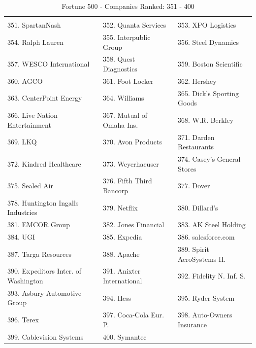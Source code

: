 \documentclass{article}
\begin{document}
\begin{table}[H]
\centering
\caption{Fortune 500 - Companies Ranked: 351 - 400}
\begin{tabular}{lll}
\hline
 \\ 351. SpartanNash 
&  352. Quanta Services 
&  353. XPO Logistics 
\\ 354. Ralph Lauren 
&  355. Interpublic Group 
&  356. Steel Dynamics 
\\ 357. WESCO International 
&  358. Quest Diagnostics 
&  359. Boston Scientific 
\\ 360. AGCO 
&  361. Foot Locker 
&  362. Hershey 
\\ 363. CenterPoint Energy 
&  364. Williams 
&  365. Dick's Sporting Goods 
\\ 366. Live Nation Entertainment 
&  367. Mutual of Omaha Ins. 
&  368. W.R. Berkley 
\\ 369. LKQ 
&  370. Avon Products 
&  371. Darden Restaurants 
\\ 372. Kindred Healthcare 
&  373. Weyerhaeuser 
&  374. Casey's General Stores 
\\ 375. Sealed Air 
&  376. Fifth Third Bancorp 
&  377. Dover 
\\ 378. Huntington Ingalls Industries 
&  379. Netflix 
&  380. Dillard's 
\\ 381. EMCOR Group 
&  382. Jones Financial 
&  383. AK Steel Holding 
\\ 384. UGI 
&  385. Expedia 
&  386. salesforce.com 
\\ 387. Targa Resources 
&  388. Apache 
&  389. Spirit AeroSystems H.
\\ 390. Expeditors Inter. of Washington 
&  391. Anixter International 
&  392. Fidelity N. Inf. S. 
\\ 393. Asbury Automotive Group 
&  394. Hess 
&  395. Ryder System 
\\ 396. Terex 
&  397. Coca-Cola Eur. P. 
&  398. Auto-Owners Insurance 
\\ 399. Cablevision Systems 
&  400. Symantec 
&   
 \\ \hline

\end{tabular}
\end{table}
\end{document}
